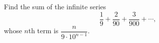 Find the sum of the infinite series
\[
\dfrac{1}{9}+\dfrac{2}{90}+\dfrac{3}{900}+\cdots,
\]
whose $n$th term is $\dfrac{n}{9\cdot10^{n-1}}$.
